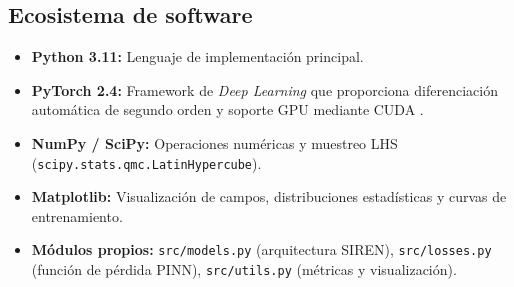 \subsection{Ecosistema de software}

\begin{itemize}
    \item \textbf{Python 3.11:} Lenguaje de implementación principal.
    \item \textbf{PyTorch 2.4:} Framework de \textit{Deep Learning} que
    proporciona diferenciación automática de segundo orden y soporte GPU
    mediante CUDA \parencite{raissi2019physics}.
    \item \textbf{NumPy / SciPy:} Operaciones numéricas y muestreo LHS
    (\texttt{scipy.stats.qmc.LatinHypercube}).
    \item \textbf{Matplotlib:} Visualización de campos, distribuciones
    estadísticas y curvas de entrenamiento.
    \item \textbf{Módulos propios:} \texttt{src/models.py} (arquitectura SIREN),
    \texttt{src/losses.py} (función de pérdida PINN), \texttt{src/utils.py}
    (métricas y visualización).
\end{itemize}
